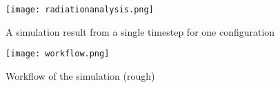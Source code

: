 
\begin{figure}
\begin{center}
\texttt{[image: radiationanalysis.png]}
\caption{A simulation result from a single timestep for one configuration}
\label{fig:radiation}
\end{center}
\end{figure}


\begin{figure}
\begin{center}
\texttt{[image: workflow.png]}
\caption{Workflow of the simulation (rough)}
\label{fig:workflow}
\end{center}
\end{figure}